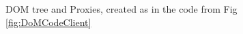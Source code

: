  
\begin{figure}[th] 
\caption{DOM tree and Proxies, created as in the code from Fig \ref{fig:DoMCodeClient}}
 \label{f:DOM:Tree:Diagrs}
 \end{figure}



